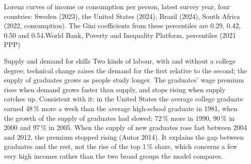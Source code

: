 \begin{omchart}{Lorenz curves of income or consumption per person, latest survey year, four countries: Sweden (2023), the United States (2024), Brazil (2024), South Africa
(2022, consumption). The Gini coefficients from these percentiles are 0.29, 0.42, 0.50 and 0.54.}{World Bank, Poverty and Inequality Platform, percentiles (2021 PPP)}
\end{omchart}

\begin{model}{Supply and demand for skills}
\assumes Two kinds of labour, with and without a college degree; technical change raises the demand for the first relative to the second; the supply of graduates grows
  as people study longer.
\predicts The graduates' wage premium rises when demand grows faster than supply, and stops rising when supply catches up.
\tested Consistent with it: in the United States the average college graduate earned 48\,\% more a week than the average high-school graduate in 1981, when the growth of the supply of
  graduates had slowed; 72\,\% more in 1990, 90\,\% in 2000 and 97\,\% in 2005. When the supply of new graduates rose fast between 2004 and 2012, the premium stopped
  rising (Autor 2014).
\breaks It explains the gap between graduates and the rest, not the rise of the top 1\,\% share, which concerns a few very high incomes rather than the two broad
  groups the model compares.
\end{model}

